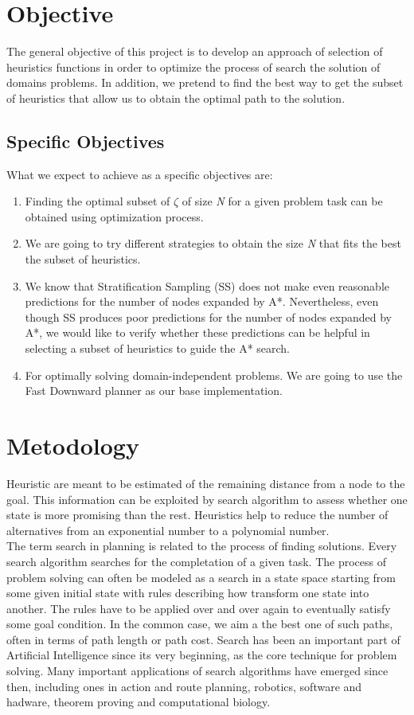 \documentclass[a4paper,12pt]{article}
\begin{document}
\section{Objective}

The general objective of this project is to develop an approach of selection of heuristics functions in order to optimize the process of search the solution of domains problems. In addition, we pretend to find the best way to get the subset of heuristics that allow us to obtain the optimal path to the solution.

\subsection{Specific Objectives}
What we expect to achieve as a specific objectives are:
\begin{enumerate}
\item Finding the optimal subset of $\zeta$ of size \textit{N} for a given problem task can be obtained using optimization process.
\item We are going to try different strategies to obtain the size \textit{N} that fits the best the subset of heuristics.
\item We know that Stratification Sampling (SS) does not make even reasonable predictions for the number of nodes expanded by A*. Nevertheless, even though SS produces poor predictions for the number of nodes expanded by A*, we would like to verify whether these predictions can be helpful in selecting a subset of heuristics to guide the A* search.
\item For optimally solving domain-independent problems. We are going to use the Fast Downward planner as our base implementation.
\end{enumerate}

\section{Metodology}
Heuristic are meant to be estimated of the remaining distance from a node to the goal. This information can be exploited by search algorithm to assess whether one state is more promising than the rest. Heuristics help to reduce the number of alternatives from an exponential number to a polynomial number.\\

The term search in planning is related to the process of finding solutions. Every search algorithm searches for the completation of a given task. The process of problem solving can often be modeled as a search in a state space starting from some given initial state with rules describing how transform one state into another. The rules have to be applied over and over again to eventually satisfy some goal condition. In the common case, we aim a the best one of such paths, often in terms of path length or path cost. Search has been an important part of Artificial Intelligence since its very beginning, as the core technique for problem solving. Many important applications of search algorithms have emerged since then, including ones in action and route planning, robotics, software and hadware, theorem proving and computational biology.
\end{document}
